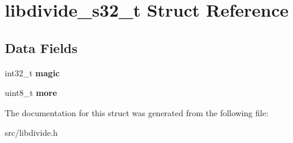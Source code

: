 \hypertarget{structlibdivide__s32__t}{}\section{libdivide\+\_\+s32\+\_\+t Struct Reference}
\label{structlibdivide__s32__t}
\subsection*{Data Fields}
\begin{DoxyCompactItemize}
\item 
\mbox{\label{structlibdivide__s32__t_a26f5015ce3a38a3f962e848d851bbff3}} 
int32\+\_\+t {\bfseries magic}
\item 
\mbox{\label{structlibdivide__s32__t_aac2b77012fb8e16a7ce18a9e1362d819}} 
uint8\+\_\+t {\bfseries more}
\end{DoxyCompactItemize}


The documentation for this struct was generated from the following file\+:\begin{DoxyCompactItemize}
\item 
src/libdivide.\+h\end{DoxyCompactItemize}

